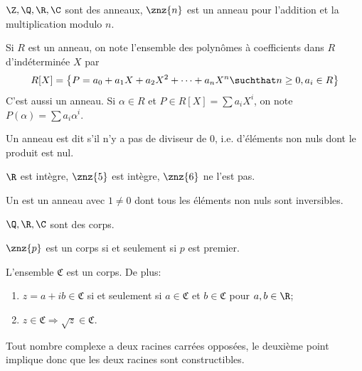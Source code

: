 \documentclass[math, info]{mpb-cours}
\def\fC{\mathfrak{C}}
\begin{document}
\begin{exemple}
	$\Z, \Q, \R, \C$ sont des anneaux, $\znz{n}$ est un anneau pour l'addition et la multiplication modulo
	$n$.
\end{exemple}

\begin{definition}
	Si $R$ est un anneau, on note l'ensemble des polynômes à coefficients dans $R$ d'indéterminée $X$
	par
	\begin{equation*}
		R[X] = \left\{P = a_{0} + a_{1}X + a_{2}X^{2} + \cdots + a_{n}X^{n} \suchthat n \geq 0, a_{i} \in R \right\}
	\end{equation*}
	C'est aussi un anneau.
	Si $\alpha \in R$ et $P \in R[X] = \sum a_{i} X^{i}$, on note $P(\alpha) = \sum a_{i}\alpha^{i}$.
\end{definition}

\begin{definition}
	Un anneau est dit  s'il n'y a pas de diviseur de $0$, i.e. d'éléments non nuls dont
	le produit est nul.
\end{definition}

\begin{exemple}
	$\R$ est intègre, $\znz{5}$ est intègre, $\znz{6}$ ne l'est pas.
\end{exemple}

\begin{definition}
	Un  est un anneau avec $1 \neq 0$ dont tous les éléments non nuls sont inversibles.
\end{definition}

\begin{exemple}
	$\Q, \R, \C$ sont des corps.
\end{exemple}

\begin{thm}
	$\znz{p}$ est un corps si et seulement si $p$ est premier.
\end{thm}

\begin{thm}
	L'ensemble $\fC$ est un corps. De plus:
	\begin{enumerate}
		\item $z = a +ib \in \fC$ si et seulement si $a \in \fC$ et $b \in \fC$ pour $a, b \in \R$;
		\item $z \in \fC \Rightarrow \sqrt{z} \in \fC$.
	\end{enumerate}
\end{thm}

\begin{remarque}
	Tout nombre complexe a deux racines carrées opposées, le deuxième point implique donc que les
	deux racines sont constructibles.
\end{remarque}
\end{document}
